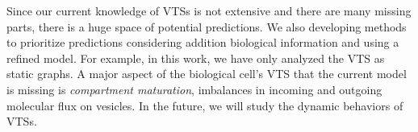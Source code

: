 Since our current knowledge of VTSs is not extensive and there are many missing parts,
there is a huge space of potential predictions.
%
We also developing methods to prioritize predictions considering addition biological
information and using a refined model.
%
For example, in this work, we have only analyzed the VTS as static graphs. A major aspect of the biological cell’s VTS that the current model is missing is \textit{compartment maturation}, imbalances in incoming and outgoing molecular flux on vesicles.
%
In the future, we will study the dynamic behaviors of VTSs.
%
%


%


